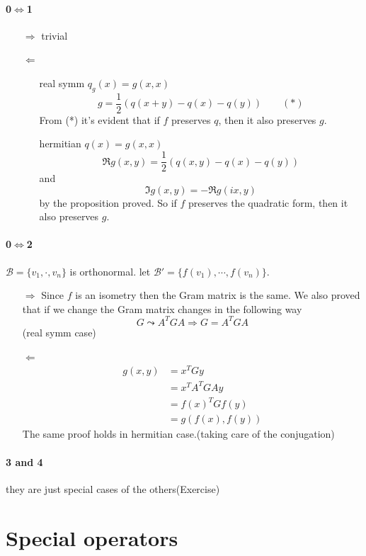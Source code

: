 \documentclass{book}
\begin{document}
\subsubsection{0$\Leftrightarrow$1}
\begin{itemize}
    \item [$\Rightarrow$]trivial
    \item[$\Leftarrow$]
    \begin{itemize}
        \item [real symm]$q_g(x)=g(x,x)$$$g=\frac{1}{2}\left(q(x+y)-q(x)-q(y)\right)\qquad(*)$$
        From (*) it's evident that if $f$ preserves $q$, then it also preserves $g$.
        \item [hermitian]$q(x)=g(x,x)$$$\Re  g(x,y)=\frac{1}{2}\left(q(x,y)-q(x)-q(y)\right)$$
        and $$\Im g(x,y)=-\Re g(ix,y)$$ by the proposition proved. So if $f$ preserves the quadratic form, then it also preserves $g$.
    \end{itemize}
\end{itemize}
\subsubsection{0$\Leftrightarrow$2}
$\mathcal{B}=\{v_1,\cdot,v_n\}$ is orthonormal. let $\mathcal{B}'=\{f(v_1),\cdots,f(v_n)\}$. 
\begin{itemize}
    
\item[$\Rightarrow$]
Since $f$ is an isometry then the Gram matrix is the same. We also proved that if we change the Gram matrix changes in the following way
$$G\leadsto A^TGA\Rightarrow G=A^TGA$$(real symm case)
\item[$\Leftarrow$]$$\begin{aligned}
    g(x,y)&=x^TGy\\
    &=x^TA^TGAy\\
    &=f(x)^TGf(y)\\
    &=g(f(x),f(y))
\end{aligned}$$ 
The same proof holds in hermitian case.(taking care of the conjugation)
\end{itemize}
\subsubsection{3 and 4}they are just special cases of the others(Exercise)
\chapter{Special operators}
\end{document}
